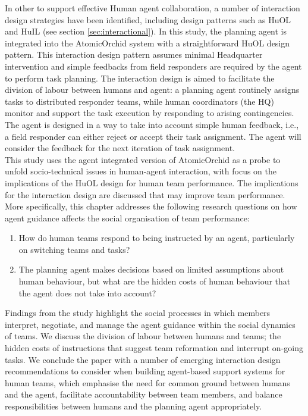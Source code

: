 In other to support effective Human agent collaboration, a number of interaction design strategies have been identified, including design patterns such as HuOL and HuIL (see section \ref{sec:interactional}). In this study, the planning agent is integrated into the AtomicOrchid system with a straightforward HuOL design pattern. This interaction design pattern assumes minimal Headquarter intervention and simple feedbacks from field responders are required by the agent to perform task planning. The interaction design is aimed to facilitate the division of labour between humans and agent: a planning agent routinely assigns tasks to distributed responder teams, while human coordinators (the HQ) monitor and support the task execution by responding to arising contingencies. The agent is designed in a way to take into account simple human feedback, i.e., a field responder can either reject or accept their task assignment. The agent will consider the feedback for the next iteration of task assignment.\\


This study uses the agent integrated version of AtomicOrchid as a probe to unfold socio-technical issues in human-agent interaction, with focus on the implications of the HuOL design for human team performance. The implications for the interaction design are discussed that may improve team performance. More specifically, this chapter addresses the following research questions on how agent guidance affects the social organisation of team performance:\\

\begin{enumerate}
\item How do human teams respond to being instructed by an agent, particularly on switching teams and tasks?\\
\item The planning agent makes decisions based on limited assumptions about human behaviour, but what are the hidden costs of human behaviour that the agent does not take into account?\\
\end{enumerate}

Findings from the study highlight the social processes in which members interpret, negotiate, and manage the agent guidance within the social dynamics of teams. We discuss the division of labour between humans and teams; the hidden costs of instructions that suggest team reformation and interrupt on-going tasks. We conclude the paper with a number of emerging interaction design recommendations to consider when building agent-based support systems for human teams, which emphasise the need for common ground between humans and the agent, facilitate accountability between team members, and balance responsibilities between humans and the planning agent appropriately.\\


